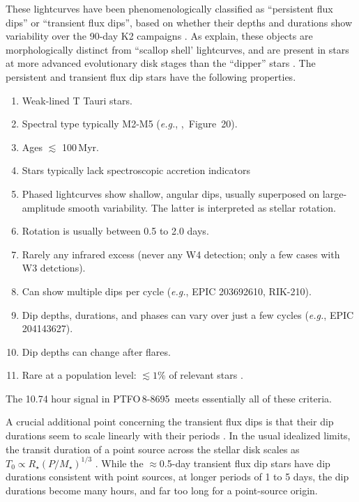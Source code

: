 \documentclass[12pt,twocolumn,tighten]{aastex62}
\newcommand{\ptfo}{PTFO$\,$8-8695}
\begin{document}
These lightcurves have been phenomenologically classified as
``persistent flux dips'' or ``transient flux dips'', based on whether
their depths and durations show variability over the 90-day K2
campaigns \citep{stauffer_orbiting_2017}.
As \citet{stauffer_orbiting_2017} explain,
these  objects are morphologically distinct from ``scallop shell' lightcurves,
and are present in stars at more advanced evolutionary disk stages than
the ``dipper'' stars \citep{ansdell_young_2016,cody_manyfaceted_2018}.
The persistent and transient flux dip stars have the following properties.
\begin{enumerate}
  \item Weak-lined T Tauri stars.
  \item Spectral type typically M2-M5 ({\it e.g.},
    \citealt{rebull_usco_2018},~Figure~20).
  \item Ages $\lesssim$ 100$\,$Myr.
  \item Stars typically lack spectroscopic accretion indicators 
  \item Phased lightcurves show shallow, angular dips, usually
    superposed on large-amplitude smooth variability. The latter
    is interpreted as stellar rotation.
  \item Rotation is usually between 0.5 to 2.0 days.
  \item Rarely any infrared excess (never any W4 detection; only a few
    cases with W3 detctions).
  \item Can show multiple dips per cycle ({\it e.g.}, EPIC 203692610,
    RIK-210).
  \item Dip depths, durations, and phases can vary over just a few cycles
    ({\it e.g.}, EPIC 204143627).
  \item Dip depths can change after flares.
  \item Rare at a population level: $\lesssim 1\%$ of relevant stars
    \citep{rebull_usco_2018}.
\end{enumerate}
The 10.74 hour signal in \ptfo\ meets essentially all of these
criteria.

A crucial additional point concerning the transient flux dips is
that their dip durations seem to scale linearly with
their periods \citep[][Figure~26]{stauffer_orbiting_2017}.
In the usual idealized limits, the transit duration of a point source
across the stellar disk scales as $T_0 \propto R_\star (P/M_\star)^{1/3}$
\citep{winn_exoplanet_2010}.
While the $\approx$0.5-day transient flux dip stars have dip
durations consistent with point sources, at longer periods of
1 to 5 days, the dip durations become many hours, and far
too long for a point-source origin.
\end{document}
